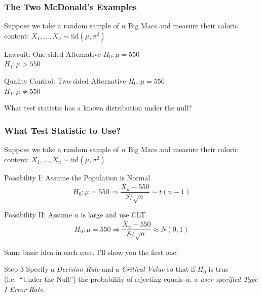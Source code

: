 \documentclass[handout]{beamer}
\begin{document}

\begin{frame}
\frametitle{The Two McDonald's Examples}
Suppose we take a random sample of $n$ Big Macs and measure their caloric content: $X_1, \hdots, X_n \sim \mbox{iid} (\mu, \sigma^2)$

\begin{block}{Lawsuit: One-sided Alternative}
$H_0\colon \mu = 550$\\
$H_1\colon \mu > 550$
\end{block}
\begin{block}{Quality Control: Two-sided Alternative}
$H_0\colon \mu = 550$\\
$H_1\colon \mu \neq 550$
\end{block}
\alert{What test statistic has a known distribution under the null?}
\end{frame}

\begin{frame}
\frametitle{What Test Statistic to Use?}
Suppose we take a random sample of $n$ Big Macs and measure their caloric content: $X_1, \hdots, X_n \sim \mbox{iid} (\mu, \sigma^2)$

\begin{block}{Possibility I: Assume the Population is Normal}
 $$H_0\colon \mu = 550 \Rightarrow \displaystyle \frac{\bar{X}_n - 550}{S/\sqrt{n}}\sim t(n-1)$$
\end{block}

\begin{block}{Possibility II: Assume $n$ is large and use CLT}
 $$H_0\colon \mu = 550 \Rightarrow \displaystyle \frac{\bar{X}_n - 550}{S/\sqrt{n}}\approx N(0,1)$$
\end{block}

\alert{Same basic idea in each case. I'll show you the first one.}
\end{frame}



\begin{frame}
\begin{alertblock}{Step 3}
Specify a \emph{Decision Rule} and a \emph{Critical Value} so that if $H_0$ is true (i.e.\ ``Under the Null'') the probability of rejecting equals $\alpha$, a \emph{user specified Type I Error Rate}.
\end{alertblock}
\end{frame}

\end{document}
